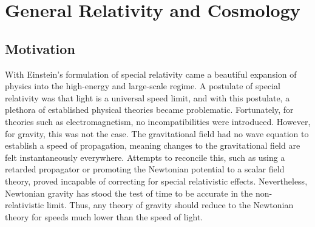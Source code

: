 \chapter{General Relativity and Cosmology}
\section{Motivation}
With Einstein's formulation of special relativity came a beautiful expansion of physics into the high-energy and large-scale regime. A postulate of special relativity was that light is a universal speed limit, and with this postulate, a plethora of established physical theories became problematic. Fortunately, for theories such as electromagnetism, no incompatibilities were introduced. However, for gravity, this was not the case. The gravitational field had no wave equation to establish a speed of propagation, meaning changes to the gravitational field are felt instantaneously everywhere. Attempts to reconcile this, such as using a retarded propagator or promoting the Newtonian potential to a scalar field theory, proved incapable of correcting for special relativistic effects. Nevertheless, Newtonian gravity has stood the test of time to be accurate in the non-relativistic limit. Thus, any theory of gravity should reduce to the Newtonian theory for speeds much lower than the speed of light.

